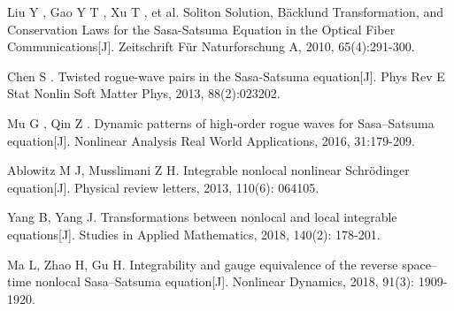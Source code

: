 \begin{thebibliography}{0}
Liu Y , Gao Y T , Xu T , et al. Soliton Solution, Bäcklund Transformation, and Conservation Laws for the Sasa-Satsuma Equation in the Optical Fiber Communications[J]. Zeitschrift Für Naturforschung A, 2010, 65(4):291-300.

Chen S . Twisted rogue-wave pairs in the Sasa-Satsuma equation[J]. Phys Rev E Stat Nonlin Soft Matter Phys, 2013, 88(2):023202.

Mu G , Qin Z . Dynamic patterns of high-order rogue waves for Sasa–Satsuma equation[J]. Nonlinear Analysis Real World Applications, 2016, 31:179-209.


Ablowitz M J, Musslimani Z H. Integrable nonlocal nonlinear Schrödinger equation[J]. Physical review letters, 2013, 110(6): 064105.

Yang B, Yang J. Transformations between nonlocal and local integrable equations[J]. Studies in Applied Mathematics, 2018, 140(2): 178-201.

Ma L, Zhao H, Gu H. Integrability and gauge equivalence of the reverse space–time nonlocal Sasa–Satsuma equation[J]. Nonlinear Dynamics, 2018, 91(3): 1909-1920.

\end{thebibliography}
\cleardoublepage
